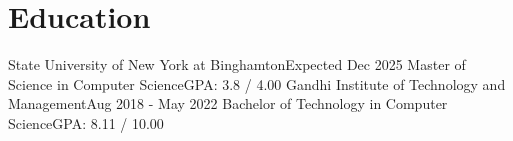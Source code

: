 \section{Education}
    \resumeSubHeadingListStart

    \resumeSubheading
    {State University of New York at Binghamton}{Expected Dec 2025}
    {Master of Science in Computer Science}{GPA: 3.8 / 4.00}
    \resumeItemListStart
    \resumeItemListEnd
    \resumeSubheading
    {Gandhi Institute of Technology and Management}{Aug 2018 - May 2022}
    {Bachelor of Technology in Computer Science}{GPA: 8.11 / 10.00}

    \resumeSubHeadingListEnd